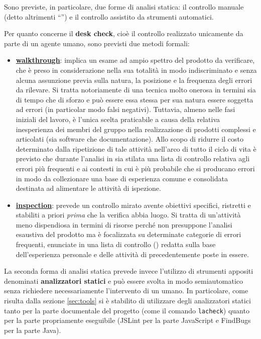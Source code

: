 {Sono previste, in particolare, due forme di analisi statica: il controllo manuale (detto altrimenti ``'') e il controllo assistito da strumenti automatici.

Per quanto concerne il \textbf{desk check}, cioè il controllo realizzato unicamente da parte di un agente umano, sono previsti due metodi formali:
\begin{itemize}
  \item \textbf{\underline{walkthrough}}: implica un esame ad ampio spettro del prodotto da verificare, che è preso in considerazione nella sua totalità in modo indiscriminato e senza alcuna assunzione previa sulla natura, la posizione e la frequenza degli errori da rilevare. Si tratta notoriamente di una tecnica molto onerosa in termini sia di tempo che di sforzo e può essere essa stessa per sua natura essere soggetta ad errori (in particolar modo falsi negativi). Tuttavia, almeno nelle fasi iniziali del lavoro, è l'unica scelta praticabile a causa della relativa inesperienza dei membri del gruppo nella realizzazione di prodotti complessi e articolati (sia software che documentazione). Allo scopo di ridurre il costo determinato dalla ripetizione di tale attività nell'arco di tutto il ciclo di vita è previsto che durante l'analisi in sia stilata una lista di controllo relativa agli errori più frequenti e ai contesti in cui è più probabile che si producano errori in modo da collezionare una base di esperienza comune e consolidata destinata ad alimentare le attività di ispezione.
  \item \textbf{\underline{inspection}}: prevede un controllo mirato avente obiettivi specifici, ristretti e stabiliti a priori \emph{prima} che la verifica abbia luogo. Si tratta di un'attività meno dispendiosa in termini di risorse perché non presuppone l'analisi esaustiva del prodotto ma è focalizzata su determinate categorie di errori frequenti, enunciate in una lista di controllo () redatta sulla base dell'esperienza personale e delle attività di  precedentemente poste in essere.
\end{itemize}

La seconda forma di analisi statica prevede invece l'utilizzo di strumenti appositi denominati \textbf{analizzatori statici} e può essere svolta in modo semiautomatico senza richiedere necessariamente l'intervento di un umano. In particolare, come risulta dalla sezione \ref{sec:tools} si è stabilito di utilizzare degli analizzatori statici tanto per la parte documentale del progetto (come il comando \texttt{lacheck}) quanto per la parte propriamente eseguibile (JSLint per la parte JavaScript e FindBugs per la parte Java).

}
